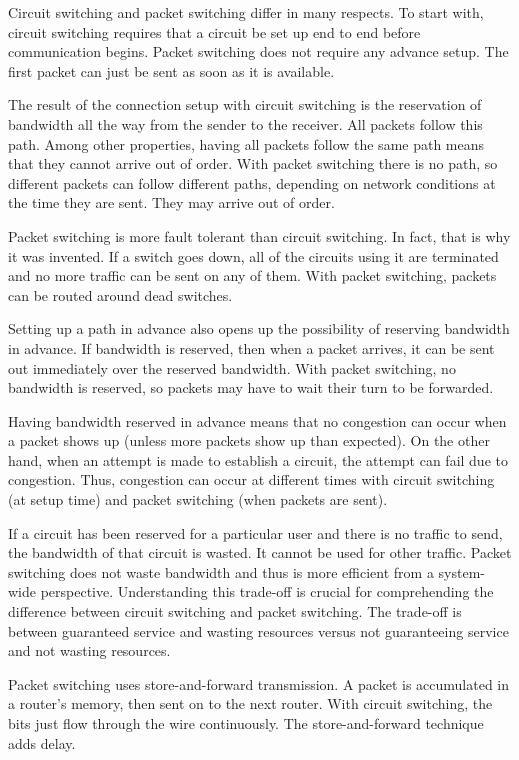 \documentclass[b5paper,11pt]{memoir}
\begin{document}
Circuit switching and packet switching differ in many respects. To start
with, circuit switching requires that a circuit be set up end to end
before communication begins. Packet switching does not require any
advance setup. The first packet can just be sent as soon as it is
available.

The result of the connection setup with circuit switching is the
reservation of bandwidth all the way from the sender to the receiver.
All packets follow this path. Among other properties, having all packets
follow the same path means that they cannot arrive out of order. With
packet switching there is no path, so different packets can follow
different paths, depending on network conditions at the time they are
sent. They may arrive out of order.

Packet switching is more fault tolerant than circuit switching. In fact,
that is why it was invented. If a switch goes down, all of the circuits
using it are terminated and no more traffic can be sent on any of them.
With packet switching, packets can be routed around dead switches.

Setting up a path in advance also opens up the possibility of reserving
bandwidth in advance. If bandwidth is reserved, then when a packet
arrives, it can be sent out immediately over the reserved bandwidth.
With packet switching, no bandwidth is reserved, so packets may have to
wait their turn to be forwarded.

Having bandwidth reserved in advance means that no congestion can occur
when a packet shows up (unless more packets show up than expected). On
the other hand, when an attempt is made to establish a circuit, the
attempt can fail due to congestion. Thus, congestion can occur at
different times with circuit switching (at setup time) and packet
switching (when packets are sent).

If a circuit has been reserved for a particular user and there is no
traffic to send, the bandwidth of that circuit is wasted. It cannot be
used for other traffic. Packet switching does not waste bandwidth and
thus is more efficient from a system-wide perspective. Understanding
this trade-off is crucial for comprehending the difference between
circuit switching and packet switching. The trade-off is between
guaranteed service and wasting resources versus not guaranteeing service
and not wasting resources.

Packet switching uses store-and-forward transmission. A packet is
accumulated in a router's memory, then sent on to the next router. With
circuit switching, the bits just flow through the wire continuously. The
store-and-forward technique adds delay.
\end{document}

